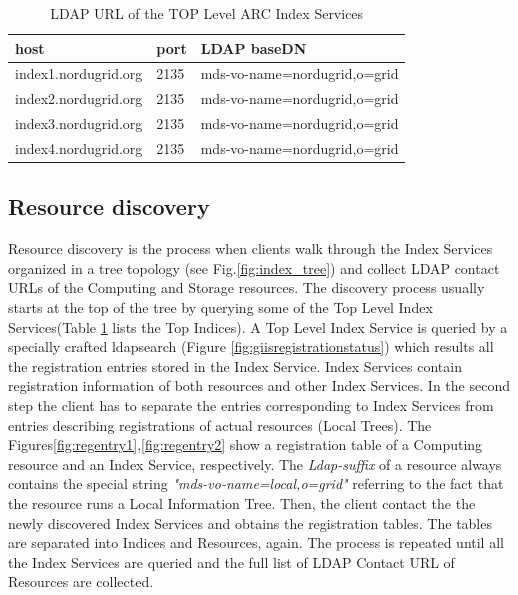 \documentclass{article}
\begin{document}


\begin{table}
\centering
\begin{tabular}{|l|l|l|}
\hline
host &
port&
LDAP baseDN \\
\hline
\hline
index1.nordugrid.org &
2135 &
mds-vo-name=nordugrid,o=grid \\
\hline
index2.nordugrid.org &
2135 &
mds-vo-name=nordugrid,o=grid \\
\hline
index3.nordugrid.org &
2135 &
mds-vo-name=nordugrid,o=grid \\
\hline
index4.nordugrid.org &
2135 &
mds-vo-name=nordugrid,o=grid \\
\hline
\end{tabular}
\caption{\label{Table:topindices} LDAP URL of the TOP Level ARC Index Services}
\end{table}




\subsection{Resource discovery}

Resource discovery is the process when clients walk through the 
Index Services organized in a tree topology (see Fig.\ref{fig:index_tree})
and collect  LDAP contact URLs of the Computing and Storage resources.
The discovery process usually starts at the top of the tree by querying some of the 
Top Level Index Services(Table \ref{Table:topindices} lists the Top Indices). 
A Top Level Index Service is queried by a specially 
crafted ldapsearch (Figure \ref{fig:giisregistrationstatus}) which results 
all the registration entries stored in the Index Service. 
Index Services contain registration information of both resources and 
other Index Services. In the second step the client 
has to separate the entries corresponding to Index Services from entries
describing registrations of actual resources (Local Trees). 
The Figures\ref{fig:regentry1},\ref{fig:regentry2} show a registration table of
a Computing resource and an Index Service, respectively. 
The {\it Ldap-suffix} of a resource always contains the special string 
{\it "mds-vo-name=local,o=grid"} referring to the fact that the resource runs
a Local Information Tree. Then, the client contact the the newly discovered Index
Services and obtains the registration tables. The tables are separated into 
Indices and Resources, again. The process is repeated until all the Index Services 
are queried and the full list of LDAP Contact URL of Resources are collected. 
\end{document}
